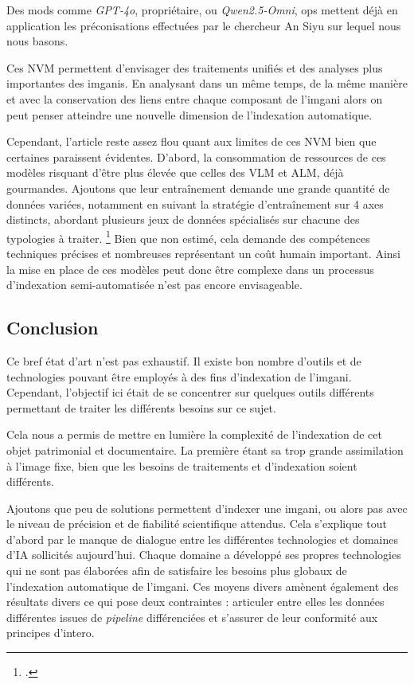 Des \glspl{mod} comme \textit{GPT-4o}, propriétaire, ou \textit{Qwen2.5-Omni}, \gls{ops} mettent déjà en application les préconisations effectuées par le chercheur An Siyu sur lequel nous nous basons.\newline

Ces \gls{NVM} permettent d'envisager des traitements unifiés et des analyses plus importantes des \glspl{imgani}. En analysant dans un même temps, de la même manière et avec la conservation des liens entre chaque composant de l'\gls{imgani} alors on peut penser atteindre une nouvelle dimension de l'indexation automatique. 

Cependant, l'article reste assez flou quant aux limites de ces \gls{NVM} bien que certaines paraissent évidentes. D'abord, la consommation de ressources de ces modèles risquant d'être plus élevée que celles des \gls{VLM} et \gls{ALM}, déjà gourmandes. Ajoutons que leur entraînement demande une grande quantité de données variées, notamment en suivant la stratégie d'entraînement sur 4 axes distincts, abordant plusieurs jeux de données spécialisés sur chacune des typologies à traiter. \footcite[p.14 à 25]{anNativeMultimodalModeling2026} Bien que non estimé, cela demande des compétences techniques précises et nombreuses représentant un coût humain important. Ainsi la mise en place de ces modèles peut donc être complexe dans un processus d'indexation semi-automatisée n'est pas encore envisageable.

\subsection{Conclusion}

Ce bref état d'art n'est pas exhaustif. Il existe bon nombre d'outils et de technologies pouvant être employés à des fins d'indexation de l'\gls{imgani}. Cependant, l'objectif ici était de se concentrer sur quelques outils différents permettant de traiter les différents besoins sur ce sujet. \newline

Cela nous a permis de mettre en lumière la complexité de l'indexation de cet objet patrimonial et documentaire. La première étant sa trop grande assimilation à l'image fixe, bien que les besoins de traitements et d'indexation soient différents.  

Ajoutons que peu de solutions permettent d'indexer une \gls{imgani}, ou alors pas avec le niveau de précision et de fiabilité scientifique attendus. Cela s'explique tout d'abord par le manque de dialogue entre les différentes technologies et domaines d'\gls{IA} sollicités aujourd'hui. Chaque domaine a développé ses propres technologies qui ne sont pas élaborées afin de satisfaire les besoins plus globaux de l'indexation automatique de l'\gls{imgani}. Ces moyens divers amènent également des résultats divers ce qui pose deux contraintes : articuler entre elles les données différentes issues de \textit{pipeline} différenciées et s'assurer de leur conformité aux principes d'\gls{intero}.

